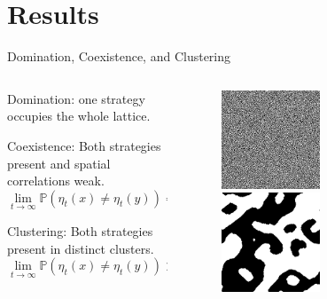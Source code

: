 \documentclass{beamer}
\newcommand{\pr}{\mathbb{P}}
\begin{document}
\section{Results}
\begin{frame}{Domination, Coexistence, and Clustering}
\begin{columns}[c]
  \begin{column}{0.5\textwidth}
    Domination: one strategy occupies the whole lattice.

    Coexistence: Both strategies present and spatial correlations weak.
\[
    \lim_{t\to\infty} \pr\left(\eta_t(x) \neq \eta_t(y)\right) = 0,\; \forall x,y\in\mathbb{Z}^d,
\]

    Clustering: Both strategies present in distinct clusters.
\[
    \lim_{t\to\infty} \pr\left(\eta_t(x)\neq\eta_t(y)\right) > 0,\; \forall x,y\in\mathbb{Z}^d,
\]
  \end{column}
  \begin{column}{0.6\textwidth}
    \begin{figure}
      \includegraphics[width=0.5\textwidth]{./images/Time1000-Process0.png}

      \includegraphics[width=0.5\textwidth]{./images/Time200-Process0.png}
    \end{figure}
  \end{column}
\end{columns}
\end{frame}
\end{document}

